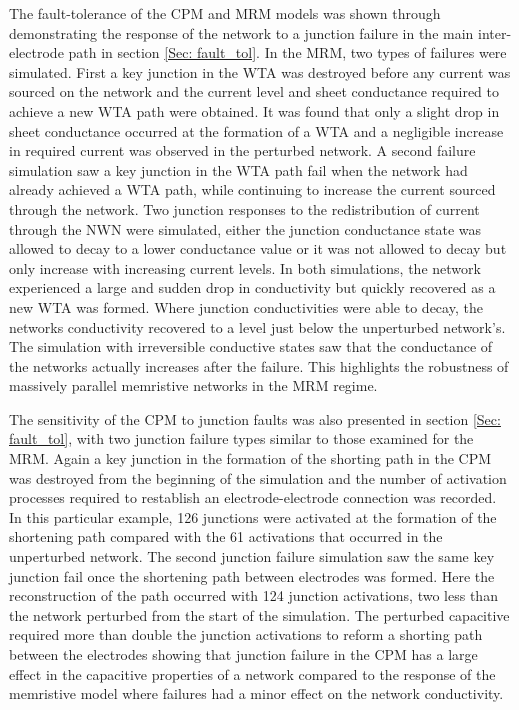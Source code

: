 The fault-tolerance of the CPM and MRM models was shown through demonstrating the response of the network to a junction failure in the main inter-electrode path in section \ref{Sec: fault_tol}. In the MRM, two types of failures were simulated. First a key junction in the WTA was destroyed before any current was sourced on the network and the current level and sheet conductance required to achieve a new WTA path were obtained. It was found that only a slight drop in sheet conductance occurred at the formation of a WTA and a negligible increase in required current was observed in the perturbed network. A second failure simulation saw a key junction in the WTA path fail when the network had already achieved a WTA path, while continuing to increase the current sourced through the network. Two junction responses to the redistribution of current through the NWN were simulated, either the junction conductance state was allowed to decay to a lower conductance value or it was not allowed to decay but only increase with increasing current levels. In both simulations, the network experienced a large and sudden drop in conductivity but quickly recovered as a new WTA was formed. Where junction conductivities were able to decay, the networks conductivity recovered to a level just below the unperturbed network's. The simulation with irreversible conductive states saw that the conductance of the networks actually increases after the failure. This highlights the robustness of massively parallel memristive networks in the MRM regime. 

The sensitivity of the CPM to junction faults was also presented in section \ref{Sec: fault_tol}, with two junction failure types similar to those examined for the MRM. Again a key junction in the formation of the shorting path in the CPM was destroyed from the beginning of the simulation and the number of activation processes required to restablish an electrode-electrode connection was recorded. In this particular example, 126 junctions were activated at the formation of the shortening path compared with the 61 activations that occurred in the unperturbed network. The second junction failure simulation saw the same key junction fail once the shortening path between electrodes was formed. Here the reconstruction of the path occurred with 124 junction activations, two less than the network perturbed from the start of the simulation. The perturbed capacitive required more than double the junction activations to reform a shorting path between the electrodes showing that junction failure in the CPM has a large effect in the capacitive properties of a network compared to the response of the memristive model where failures had a minor effect on the network conductivity.


%

